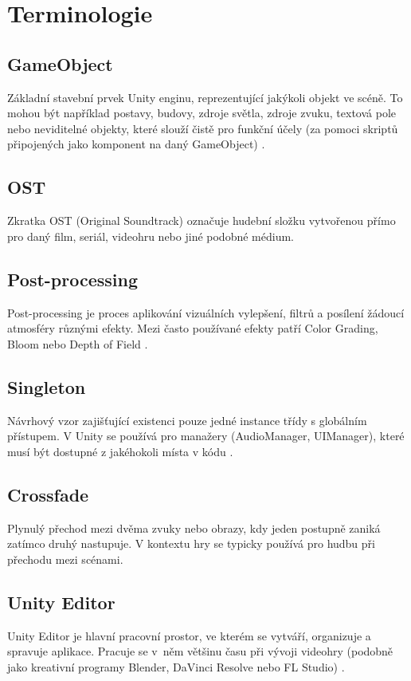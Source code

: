 \chapter{Terminologie}

\section{GameObject}
Základní stavební prvek Unity enginu, reprezentující jakýkoli objekt ve scéně. To mohou být například postavy, budovy, zdroje světla, zdroje zvuku, textová pole nebo neviditelné objekty, které slouží čistě pro funkční účely (za pomoci skriptů připojených jako komponent na daný GameObject) \cite{unity-docs}.

\section{OST}
Zkratka OST (Original Soundtrack) označuje hudební složku vytvořenou přímo pro daný film, seriál, videohru nebo jiné podobné médium.

\section{Post-processing}
Post-processing je proces aplikování vizuálních vylepšení, filtrů a posílení žádoucí atmosféry různými efekty. Mezi často používané efekty patří Color Grading, Bloom nebo Depth of Field \cite{unity-postprocessing}.

\section{Singleton}
Návrhový vzor zajišťující existenci pouze jedné instance třídy s globálním přístupem. V Unity se používá pro manažery (AudioManager, UIManager), které musí být dostupné z jakéhokoli místa v kódu \cite{unity-singleton}.

\section{Crossfade}
Plynulý přechod mezi dvěma zvuky nebo obrazy, kdy jeden postupně zaniká zatímco druhý nastupuje. V kontextu hry se typicky používá pro hudbu při přechodu mezi scénami.

\section{Unity Editor}
Unity Editor je hlavní pracovní prostor, ve kterém se vytváří, organizuje a spravuje aplikace. Pracuje se v~něm většinu času při vývoji videohry (podobně jako kreativní programy Blender, DaVinci Resolve nebo FL Studio) \cite{unity-editor}.

